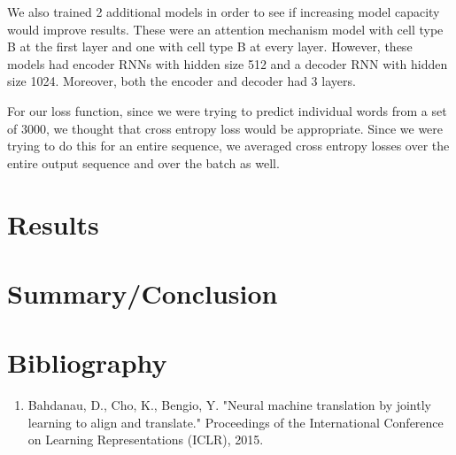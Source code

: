 \documentclass[letterpaper, 11pt]{article}
\begin{document}
\begin{multicols}{2}
We also trained 2 additional models in order to see if increasing model capacity would improve
results.
These were an attention mechanism model with cell type B at the first layer and one with
cell type B at every layer.
However, these models had encoder RNNs with hidden size 512 and a decoder RNN with hidden size
1024.
Moreover, both the encoder and decoder had 3 layers.

For our loss function, since we were trying to predict individual words from a set of 3000, we
thought that cross entropy loss would be appropriate. Since we were trying to do this for an entire
sequence, we averaged cross entropy losses over the entire output sequence and over the batch as
well.

\section{Results}







\section{Summary/Conclusion}

\section{Bibliography}
\begin{enumerate}
\item Bahdanau, D., Cho, K., Bengio, Y. "Neural machine translation by jointly learning to align and translate." Proceedings of the International Conference on Learning Representations (ICLR), 2015.


\end{enumerate}
\end{multicols}
\end{document}
